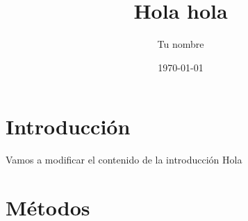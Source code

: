 \documentclass{article}
\title{Hola hola}
\author{Tu nombre}
\date{\today}
\begin{document}
\maketitle

\section{Introducción}


Vamos a modificar el contenido de la introducción
Hola 
\section {Métodos}
\end{document}

